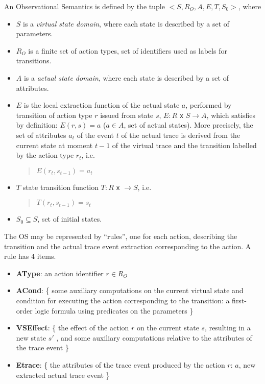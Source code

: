\begin{definition} 

An Observational Semantics is defined by the tuple $< S, R_O, A, E, T, S_0 >$, where
\begin{itemize}
\item $S$ is a  {\em virtual state domain}, where each state is described by a set of parameters.
\item $R_O$ is a finite set of action types, set of identifiers used as labels for transitions.
\item $A$ is a {\em actual state domain}, where each state is described by a set of attributes.
\item $E$ is the local extraction function of the actual state $a$, performed by transition of action type $r$ issued from state $s$, $E : R$ {\tt x} $S \rightarrow A$, which satisfies by definition: $E(r,s)= a$ ($a \in A$, set of actual states). More precisely, the set of attributes $a_t$ of the event $t$ of the actual trace is derived from the current state at moment $t-1$ of the virtual trace and the transition labelled by the action type $r_t$, i.e.
\begin{quote}
$E(r_t, s_{t-1})= a_t$
\end{quote}
\item $T$ state transition function $T : R$ {\tt x} $\rightarrow S$, i.e.
\begin{quote}
$T(r_t, s_{t-1})= s_t$
\end{quote}
\item $S_0 \subseteq S$, set of initial states.
\end{itemize}
\end{definition}

\vspace{2mm}

The OS may be represented by ``rules'', one for each action, describing the transition and the actual trace event extraction corresponding to the action. A rule has 4 items.

\vspace{0,5mm}
\begin{itemize}
\item {\bf AType}: an action identifier $r \in R_O$
\item {\bf ACond}: \{ some auxiliary computations on the current virtual state and condition for executing the action corresponding to the transition: a first-order logic formula using predicates on the parameters \}
\item {\bf VSEffect}: \{ the effect of the action $r$ on the current state $s$, resulting in a new state $s'$ , and some auxiliary computations relative to the attributes of the trace event \}
\item {\bf Etrace}: \{ the attributes of the trace event produced by the action $r$: $a$, new extracted actual trace event \} 
\end{itemize}



